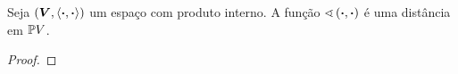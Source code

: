 \begin{proposition}
Seja $(\bm V,\left\langle{\bm{\cdot}},{\bm{\cdot}}\right\rangle)$ um espaço com produto interno. A função $\sphericalangle\left({\bm{\cdot}},{\bm{\cdot}}\right)$ é uma distância em $\mathbb{P} V$.
\end{proposition}
\begin{proof}
\begin{comment}



(Desigualdade Triangular) Sejam $r,r',r'' \in \pro V$, $u \in r \cap \S$, $u' \in r' \cap \S$ e $u'' \in r'' \cap \S$. Queremos mostrar que
	\begin{equation*}
	\ang{r}{r''} \leq \ang{r}{r'} + \ang{r'}{r''}.
	\end{equation*}
Isso é o mesmo que	
	\begin{equation*}
	\cos\inv (\abs{\inte{u}{u''}}) \leq \cos\inv (\abs{\inte{u}{u'}}) + \cos\inv (\abs{\inte{u'}{u''}}).
	\end{equation*}

Se mostrarmos que
	\begin{equation*}
	\abs{\inte{u}{u''}} \geq \abs{\inte{u}{u'}} + \abs{\inte{u'}{u''}},
	\end{equation*}
segue da monotonicidade decrescente de $\cos\inv$.
	\begin{align*}
	\abs{\inte{u}{u'}+\inte{u'}{u''}} \leq \abs{\inte{u}{u'}} + \abs{\inte{u'}{u''}}
	\end{align*}
	\begin{align*}
	\inte{u}{u'}+\inte{u''}{u'} = \inte{u+u''}{u'}
	\end{align*}


\end{comment}
\end{proof}
